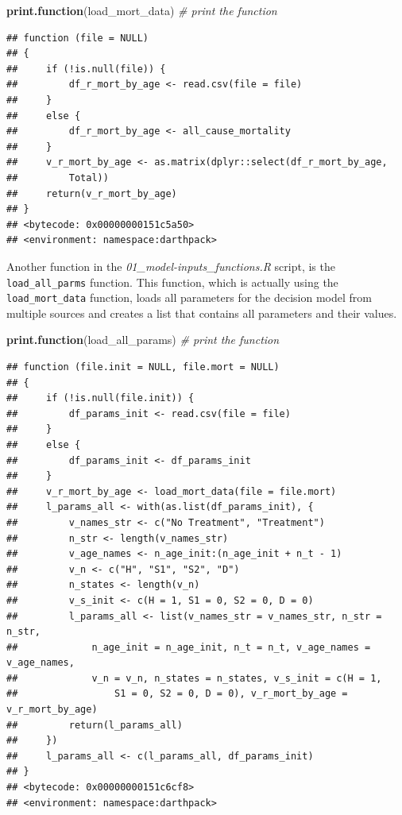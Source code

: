 \documentclass[]{book}
\newenvironment{Shaded}{\begin{snugshade}}{\end{snugshade}}
\newcommand{\CommentTok}[1]{\textcolor[rgb]{0.56,0.35,0.01}{\textit{#1}}}
\newcommand{\KeywordTok}[1]{\textcolor[rgb]{0.13,0.29,0.53}{\textbf{#1}}}
\newcommand{\NormalTok}[1]{#1}
\begin{document}
\begin{Shaded}
\begin{Highlighting}[]
\KeywordTok{print.function}\NormalTok{(load_mort_data) }\CommentTok{# print the function}
\end{Highlighting}
\end{Shaded}

\begin{verbatim}
## function (file = NULL) 
## {
##     if (!is.null(file)) {
##         df_r_mort_by_age <- read.csv(file = file)
##     }
##     else {
##         df_r_mort_by_age <- all_cause_mortality
##     }
##     v_r_mort_by_age <- as.matrix(dplyr::select(df_r_mort_by_age, 
##         Total))
##     return(v_r_mort_by_age)
## }
## <bytecode: 0x00000000151c5a50>
## <environment: namespace:darthpack>
\end{verbatim}

Another function in the \emph{01\_model-inputs\_functions.R} script, is the \texttt{load\_all\_parms} function. This function, which is actually using the \texttt{load\_mort\_data} function, loads all parameters for the decision model from multiple sources and creates a list that contains all parameters and their values.

\begin{Shaded}
\begin{Highlighting}[]
\KeywordTok{print.function}\NormalTok{(load_all_params)  }\CommentTok{# print the function}
\end{Highlighting}
\end{Shaded}

\begin{verbatim}
## function (file.init = NULL, file.mort = NULL) 
## {
##     if (!is.null(file.init)) {
##         df_params_init <- read.csv(file = file)
##     }
##     else {
##         df_params_init <- df_params_init
##     }
##     v_r_mort_by_age <- load_mort_data(file = file.mort)
##     l_params_all <- with(as.list(df_params_init), {
##         v_names_str <- c("No Treatment", "Treatment")
##         n_str <- length(v_names_str)
##         v_age_names <- n_age_init:(n_age_init + n_t - 1)
##         v_n <- c("H", "S1", "S2", "D")
##         n_states <- length(v_n)
##         v_s_init <- c(H = 1, S1 = 0, S2 = 0, D = 0)
##         l_params_all <- list(v_names_str = v_names_str, n_str = n_str, 
##             n_age_init = n_age_init, n_t = n_t, v_age_names = v_age_names, 
##             v_n = v_n, n_states = n_states, v_s_init = c(H = 1, 
##                 S1 = 0, S2 = 0, D = 0), v_r_mort_by_age = v_r_mort_by_age)
##         return(l_params_all)
##     })
##     l_params_all <- c(l_params_all, df_params_init)
## }
## <bytecode: 0x00000000151c6cf8>
## <environment: namespace:darthpack>
\end{verbatim}
\end{document}
